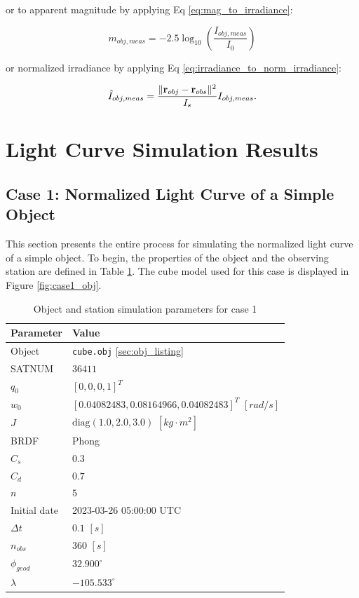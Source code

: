 or to apparent magnitude by applying Eq \ref{eq:mag_to_irradiance}:

\begin{equation}
  m_{obj,meas} = -2.5 \log_{10}\left( \frac{I_{obj,meas}}{I_0} \right)
\end{equation}

or normalized irradiance by applying Eq \ref{eq:irradiance_to_norm_irradiance}:

\begin{equation} \label{eq:ihat_meas}
  \hat{I}_{obj,meas} = \frac{\| \mathbf{r}_{obj} - \mathbf{r}_{obs} \|^2}{I_s} I_{obj,meas}.
\end{equation}

\section{Light Curve Simulation Results}

\subsection{Case 1: Normalized Light Curve of a Simple Object}

This section presents the entire process for simulating the normalized light curve of a simple object. To begin, the properties of the object and the observing station are defined in Table \ref{tb:case1_obj_props}. The cube model used for this case is displayed in Figure \ref{fig:case1_obj}.

\begin{table}[]
  \centering
  \begin{tabular}{|l|l|}
  \hline
  \textbf{Parameter} & \textbf{Value} \\ \hline
  Object & \texttt{cube.obj} \ref{sec:obj_listing} \\ \hline
  SATNUM & $36411$ \\ \hline
  $q_0$ & $\left[ 0, 0, 0, 1 \right]^T$ \\ \hline
  $w_0$ & $\left[ 0.04082483, 0.08164966, 0.04082483 \right]^T$ $[rad/s]$ \\ \hline
  $J$ & $\mathrm{diag}\left( 1.0, 2.0, 3.0 \right)$ $\left[ kg \cdot m^2 \right]$ \\ \hline
  BRDF & Phong \\ \hline
  $C_s$ & $0.3$ \\ \hline
  $C_d$ & $0.7$ \\ \hline
  $n$ & $5$ \\ \hline
  Initial date & 2023-03-26 05:00:00 UTC \\ \hline
  $\Delta t$ & $0.1$ $[s]$ \\ \hline
  $n_{obs}$ & $360$ $[s]$ \\ \hline
  $\phi_{geod}$ & $32.900^\circ$ \\ \hline
  $\lambda$ & $-105.533^\circ$ \\ \hline
  \end{tabular}
  \caption{Object and station simulation parameters for case 1}
  \label{tb:case1_obj_props}
\end{table}

